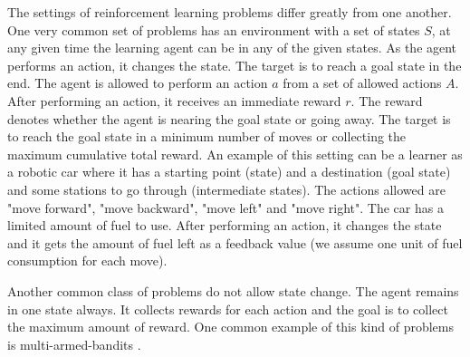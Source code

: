 \documentclass[english]{tktltiki}
\begin{document}
The settings of reinforcement learning problems differ greatly from  one another. One very common set of problems has an environment with a set of states $S$, at any given time the learning agent can be in any of the given states. As the agent performs an action, it changes the state. The target is to reach a goal state in the end. The agent is allowed to perform an action $a$ from a set of allowed actions $A$. After performing an action, it receives an immediate reward $r$. The reward denotes whether the agent is nearing the goal state or going away. The target is to reach the goal state in a minimum number of moves or collecting the maximum cumulative total reward. An example of this setting can be a learner as a robotic car where it has a starting point (state) and a destination (goal state) and some stations to go through (intermediate states). The actions allowed are "move forward", "move backward", "move left" and "move right". The car has a limited amount of fuel to use. After performing an action, it changes the state and it gets the amount of fuel left as a feedback value (we assume one unit of fuel consumption for each move).

Another common class of problems do not allow state change. The agent remains in one state always. It collects rewards for each action and the goal is to collect the maximum amount of reward. One common example of this kind of problems is multi-armed-bandits \cite{bandits}.
\end{document}
